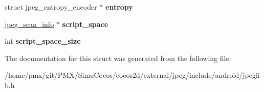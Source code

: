 \begin{DoxyCompactItemize}
\item 
\mbox{\label{structjpeg__compress__struct_a4163125198ddbdc1566cde7e4413a90d}} 
struct jpeg\+\_\+entropy\+\_\+encoder $\ast$ {\bfseries entropy}
\item 
\mbox{\label{structjpeg__compress__struct_a0158c151082693a72a46841ada4be08d}} 
\hyperlink{structjpeg__scan__info}{jpeg\+\_\+scan\+\_\+info} $\ast$ {\bfseries script\+\_\+space}
\item 
\mbox{\label{structjpeg__compress__struct_ae50a683b4baddef6571900ca6240b1a3}} 
int {\bfseries script\+\_\+space\+\_\+size}
\end{DoxyCompactItemize}


The documentation for this struct was generated from the following file\+:\begin{DoxyCompactItemize}
\item 
/home/pmx/git/\+P\+M\+X/\+Simu\+Cocos/cocos2d/external/jpeg/include/android/jpeglib.\+h\end{DoxyCompactItemize}
